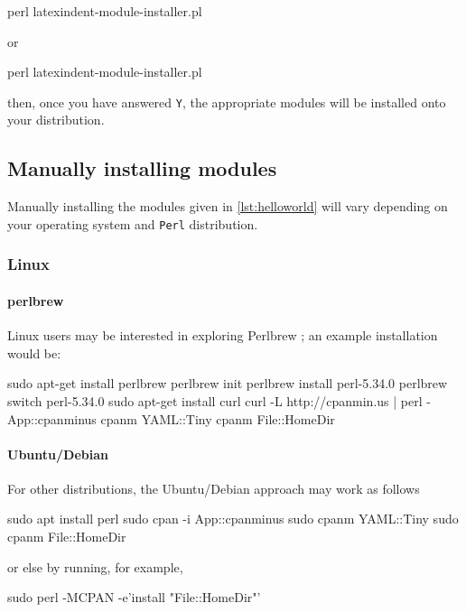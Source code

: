   \begin{commandshell}
perl latexindent-module-installer.pl
\end{commandshell}

  or
  \begin{dosprompt}
perl latexindent-module-installer.pl
 \end{dosprompt}
  then, once you have answered \texttt{Y}, the appropriate modules will be installed onto
  your distribution.

 \subsection{Manually installing modules}\label{sec:manual-module-instal}
  Manually installing the modules given in \cref{lst:helloworld} will vary depending on
  your operating system and \texttt{Perl} distribution.

 \subsubsection{Linux}
  \paragraph{perlbrew}
   Linux users may be interested in exploring Perlbrew \cite{perlbrew}; an example
   installation would be:

   \begin{commandshell}
sudo apt-get install perlbrew
perlbrew init
perlbrew install perl-5.34.0
perlbrew switch perl-5.34.0
sudo apt-get install curl
curl -L http://cpanmin.us | perl - App::cpanminus
cpanm YAML::Tiny
cpanm File::HomeDir
\end{commandshell}


  \paragraph{Ubuntu/Debian}
   For other distributions, the Ubuntu/Debian approach may work as follows

   \begin{commandshell}
sudo apt install perl
sudo cpan -i App::cpanminus
sudo cpanm YAML::Tiny
sudo cpanm File::HomeDir
\end{commandshell}

   or else by running, for example,

   \begin{commandshell}
sudo perl -MCPAN -e'install "File::HomeDir"'
\end{commandshell}

